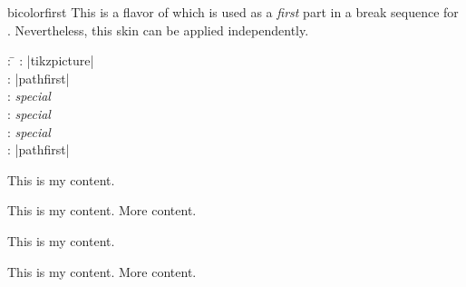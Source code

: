 \clearpage


\begin{docSkin}{bicolorfirst}
This is a flavor of  which is used as a \emph{first} part
in a break sequence for .
Nevertheless, this skin can be applied independently.
\begin{tcolorbox}[skintable=bicolorfirst]
  \begin{tabbing}
    : \=\kill
    :  \> |tikzpicture|\\ 
    :           \> |pathfirst|\\
    : \> \emph{special}\\ 
    :        \> \emph{special}\\
    :    \> \emph{special}\\
    :           \> |pathfirst|
  \end{tabbing}
\end{tcolorbox}
\end{docSkin}

\begin{dispExample}
\begin{tcbraster}[skin=bicolorfirst,raster equal height,raster columns=4,
    colback=LightGreen,colframe=DarkGreen,colbacklower=LimeGreen!75!LightGreen,
    colbacktitle=LimeGreen!75!DarkGreen,
    left=1mm,right=1mm,top=1mm,bottom=1mm,middle=1mm]
  \begin{tcolorbox}
    This is my content.
  \end{tcolorbox}
  \begin{tcolorbox}
    This is my content.
    \tcblower
    More content.
  \end{tcolorbox}
  \begin{tcolorbox}[adjusted title=My title]
    This is my content.
  \end{tcolorbox}
  \begin{tcolorbox}[adjusted title=My title]
    This is my content.
    \tcblower
    More content.
  \end{tcolorbox}
\end{tcbraster}
\end{dispExample}


